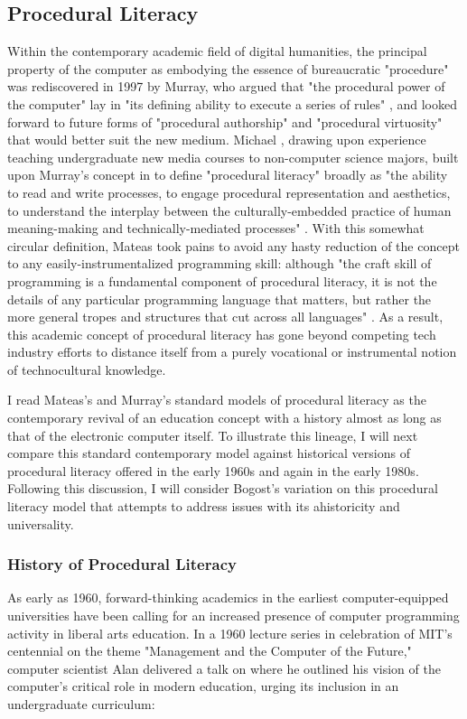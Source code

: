 \subsection*{Procedural Literacy}
Within the contemporary academic field of digital humanities, the principal property of the computer as embodying the essence of bureaucratic "procedure" was rediscovered in 1997 by Murray, who argued that "the procedural power of the computer" lay in "its defining ability to execute a series of rules" \autocite*[71]{Murray1997}, and looked forward to future forms of "procedural authorship" and "procedural virtuosity" that would better suit the new medium. Michael \citeauthor{Mateas05}, drawing upon experience teaching undergraduate new media courses to non-computer science majors, built upon Murray's concept in \citeyear{Mateas05} to define "procedural literacy" broadly as "the ability to read and write processes, to engage procedural representation and aesthetics, to understand the interplay between the culturally-embedded practice of human meaning-making and technically-mediated processes" \autocite*[101--2]{Mateas05}. With this somewhat circular definition, Mateas took pains to avoid any hasty reduction of the concept to any easily-instrumentalized programming skill: although "the craft skill of programming is a fundamental component of procedural literacy, it is not the details of any particular programming language that matters, but rather the more general tropes and structures that cut across all languages" \autocite[102]{Mateas05}. As a result, this academic concept of procedural literacy has gone beyond competing tech industry efforts to distance itself from a purely vocational or instrumental notion of technocultural knowledge.

I read Mateas's and Murray's standard models of procedural literacy as the contemporary revival of an education concept with a history almost as long as that of the electronic computer itself. To illustrate this lineage, I will next compare this standard contemporary model against historical versions of procedural literacy offered in the early 1960s and again in the early 1980s. Following this discussion, I will consider Bogost's variation on this procedural literacy model that attempts to address issues with its ahistoricity and universality.

\subsubsection*{History of Procedural Literacy}
As early as 1960, forward-thinking academics in the earliest computer-equipped universities have been calling for an increased presence of computer programming activity in liberal arts education. In a 1960 lecture series in celebration of MIT's centennial on the theme "Management and the Computer of the Future," computer scientist Alan \citeauthor{Perlis62} delivered a talk on  where he outlined his vision of the computer's critical role in modern education, urging its inclusion in an undergraduate curriculum:

